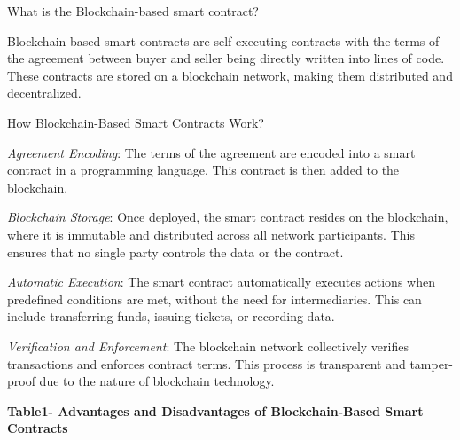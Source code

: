 What is the Blockchain-based smart contract?

Blockchain-based smart contracts are self-executing contracts with the
terms of the agreement between buyer and seller being directly written
into lines of code. These contracts are stored on a blockchain network,
making them distributed and decentralized.

How Blockchain-Based Smart Contracts Work?

\emph{Agreement Encoding}: The terms of the agreement are encoded into a
smart contract in a programming language. This contract is then added to
the blockchain.

\emph{Blockchain Storage}: Once deployed, the smart contract resides on
the blockchain, where it is immutable and distributed across all network
participants. This ensures that no single party controls the data or the
contract.

\emph{Automatic Execution}: The smart contract automatically executes
actions when predefined conditions are met, without the need for
intermediaries. This can include transferring funds, issuing tickets, or
recording data.

\emph{Verification and Enforcement}: The blockchain network collectively
verifies transactions and enforces contract terms. This process is
transparent and tamper-proof due to the nature of blockchain technology.

\textbf{Table1- Advantages and Disadvantages of Blockchain-Based Smart
Contracts}

